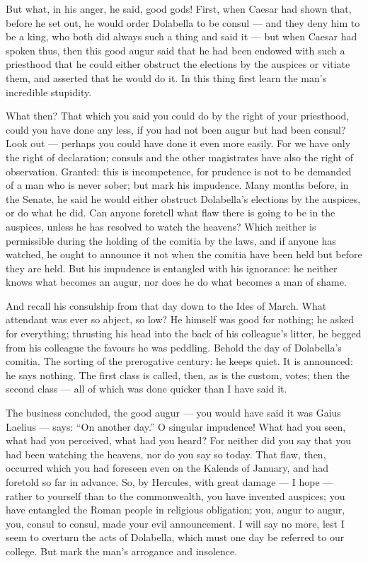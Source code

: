  But what, in his anger, he said, good gods! First, when Caesar had shown that, before he set out, he would order Dolabella to be consul --- and they deny him to be a king, who both did always such a thing and said it ---  but when Caesar had spoken thus, then this good augur said that he had been endowed with such a priesthood that he could either obstruct the elections by the auspices or vitiate them, and asserted that he would do it. In this thing first learn the man's incredible stupidity.

 What then? That which you said you could do by the right of your priesthood, could you have done any less, if you had not been augur but had been consul? Look out --- perhaps you could have done it even more easily. For we have only the right of declaration; consuls and the other magistrates have also the right of observation. Granted: this is incompetence, for prudence is not to be demanded of a man who is never sober; but mark his impudence. Many months before, in the Senate, he said he would either obstruct Dolabella's elections by the auspices, or do what he did. Can anyone foretell what flaw there is going to be in the auspices, unless he has resolved to watch the heavens? Which neither is permissible during the holding of the comitia by the laws, and if anyone has watched, he ought to announce it not when the comitia have been held but before they are held. But his impudence is entangled with his ignorance: he neither knows what becomes an augur, nor does he do what becomes a man of shame.

 And recall his consulship from that day down to the Ides of March. What attendant was ever so abject, so low? He himself was good for nothing; he asked for everything; thrusting his head into the back of his colleague's litter, he begged from his colleague the favours he was peddling. Behold the day of Dolabella's comitia. The sorting of the prerogative century: he keeps quiet. It is announced: he says nothing. The first class is called, then, as is the custom, votes; then the second class --- all of which was done quicker than I have said it.

 The business concluded, the good augur --- you would have said it was Gaius Laelius --- says: ``On another day.'' O singular impudence! What had you seen, what had you perceived, what had you heard? For neither did you say that you had been watching the heavens, nor do you say so today. That flaw, then, occurred which you had foreseen even on the Kalends of January, and had foretold so far in advance. So, by Hercules, with great damage --- I hope --- rather to yourself than to the commonwealth, you have invented auspices; you have entangled the Roman people in religious obligation; you, augur to augur, you, consul to consul, made your evil announcement. I will say no more, lest I seem to overturn the acts of Dolabella, which must one day be referred to our college. But mark the man's arrogance and insolence.

